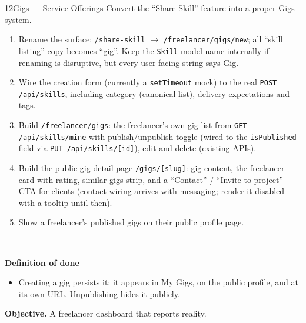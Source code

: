 \documentclass[11pt,a4paper]{article}
\newcommand{\dod}{\medskip\noindent\textcolor{donegreen}{\rule{\linewidth}{0.5pt}}\\[1mm]\textbf{\textcolor{donegreen}{Definition of done}}\\[-2mm]}
\newcommand{\objective}[1]{\noindent\textbf{Objective.} #1\medskip}
\begin{document}
\begin{promptbox}{12}{Gigs --- Service Offerings}
Convert the ``Share Skill'' feature into a proper Gigs system.

\begin{enumerate}[leftmargin=1.6em]
  \item Rename the surface: \texttt{/share-skill} $\rightarrow$
        \texttt{/freelancer/gigs/new}; all ``skill listing'' copy becomes ``gig''.
        Keep the \texttt{Skill} model name internally if renaming is disruptive, but
        every user-facing string says Gig.
  \item Wire the creation form (currently a \texttt{setTimeout} mock) to the real
        \texttt{POST /api/skills}, including category (canonical list), delivery
        expectations and tags.
  \item Build \texttt{/freelancer/gigs}: the freelancer's own gig list from
        \texttt{GET /api/skills/mine} with publish/unpublish toggle (wired to the
        \texttt{isPublished} field via \texttt{PUT /api/skills/[id]}), edit and
        delete (existing APIs).
  \item Build the public gig detail page \texttt{/gigs/[slug]}: gig content, the
        freelancer card with rating, similar gigs strip, and a ``Contact'' /
        ``Invite to project'' CTA for clients (contact wiring arrives with
        messaging; render it disabled with a tooltip until then).
  \item Show a freelancer's published gigs on their public profile page.
\end{enumerate}

\dod
\begin{itemize}[leftmargin=1.6em]
  \item Creating a gig persists it; it appears in My Gigs, on the public profile,
        and at its own URL. Unpublishing hides it publicly.
\end{itemize}
\end{promptbox}

\objective{A freelancer dashboard that reports reality.}
\end{document}

